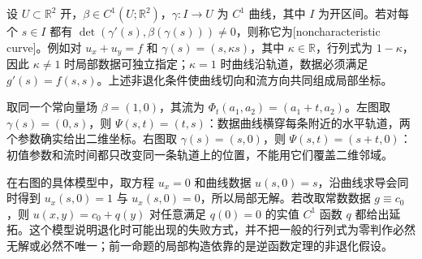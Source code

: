 设 \(U\subset\mathbb R^2\) 开，\(\beta\in C^1(U;\mathbb R^2)\)，\(\gamma:I\to U\) 为 \(C^1\) 曲线，其中 \(I\) 为开区间。若对每个 \(s\in I\) 都有 \(\det(\gamma'(s),\beta(\gamma(s)))\ne0\)，则称它为[noncharacteristic curve]。例如对 \(u_x+u_y=f\) 和 \(\gamma(s)=(s,\kappa s)\)，其中 \(\kappa\in\mathbb R\)，行列式为 \(1-\kappa\)，因此 \(\kappa\ne1\) 时局部数据可独立指定；\(\kappa=1\) 时曲线沿轨道，数据必须满足 \(g'(s)=f(s,s)\)。上述非退化条件使曲线切向和流方向共同组成局部坐标。

\ProseParagraphBreak

取同一个常向量场 \(\beta=(1,0)\)，其流为 \(\Phi_t(a_1,a_2)=(a_1+t,a_2)\)。左图取 \(\gamma(s)=(0,s)\)，则 \(\Psi(s,t)=(t,s)\)：数据曲线横穿每条附近的水平轨道，两个参数确实给出二维坐标。右图取 \(\gamma(s)=(s,0)\)，则 \(\Psi(s,t)=(s+t,0)\)：初值参数和流时间都只改变同一条轨道上的位置，不能用它们覆盖二维邻域。



在右图的具体模型中，取方程 \(u_x=0\) 和曲线数据 \(u(s,0)=s\)，沿曲线求导会同时得到 \(u_x(s,0)=1\) 与 \(u_x(s,0)=0\)，所以局部无解。若改取常数数据 \(g\equiv c_0\)，则 \(u(x,y)=c_0+q(y)\) 对任意满足 \(q(0)=0\) 的实值 \(C^1\) 函数 \(q\) 都给出延拓。这个模型说明退化时可能出现的失败方式，并不把一般的行列式为零判作必然无解或必然不唯一；前一命题的局部构造依靠的是逆函数定理的非退化假设。
